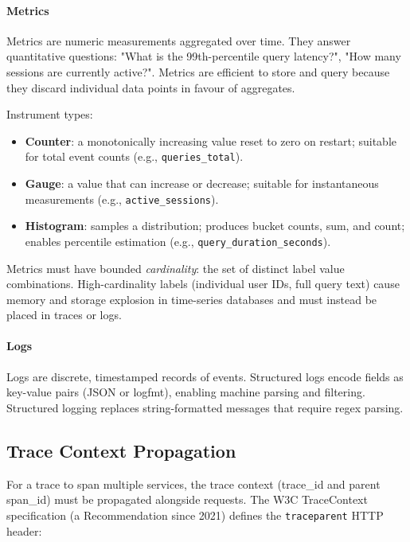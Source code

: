 \paragraph{Metrics}

Metrics are numeric measurements aggregated over time. They answer quantitative questions: "What is the 99th-percentile query latency?", "How many sessions are currently active?". Metrics are efficient to store and query because they discard individual data points in favour of aggregates.

Instrument types:
\begin{itemize}
    \item \textbf{Counter}: a monotonically increasing value reset to zero on restart; suitable for total event counts (e.g., \texttt{queries\_total}).
    \item \textbf{Gauge}: a value that can increase or decrease; suitable for instantaneous measurements (e.g., \texttt{active\_sessions}).
    \item \textbf{Histogram}: samples a distribution; produces bucket counts, sum, and count; enables percentile estimation (e.g., \texttt{query\_duration\_seconds}).
\end{itemize}

Metrics must have bounded \emph{cardinality}: the set of distinct label value combinations. High-cardinality labels (individual user IDs, full query text) cause memory and storage explosion in time-series databases and must instead be placed in traces or logs.

\paragraph{Logs}

Logs are discrete, timestamped records of events. Structured logs encode fields as key-value pairs (JSON or logfmt), enabling machine parsing and filtering. Structured logging replaces string-formatted messages that require regex parsing.

\subsection{Trace Context Propagation}

For a trace to span multiple services, the trace context (trace\_id and parent span\_id) must be propagated alongside requests. The W3C TraceContext specification (a Recommendation since 2021) defines the \texttt{traceparent} HTTP header:


